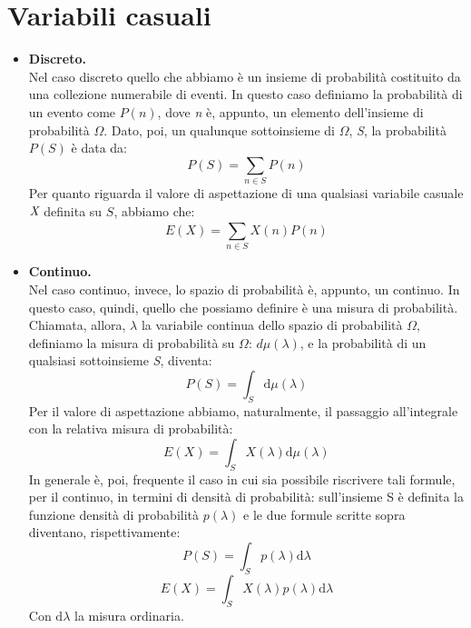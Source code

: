 \section{Variabili casuali} %
\begin{itemize}
\item \textbf{Discreto.}\\

Nel caso discreto quello che abbiamo è un insieme di probabilità costituito da una collezione numerabile di  eventi. In questo caso definiamo la probabilità di un evento come $P(n)$, dove \emph{n} è, appunto, un elemento dell'insieme di probabilità $\Omega$.
Dato, poi, un qualunque sottoinsieme di $\Omega$, \emph{S}, la probabilità $P(S)$ è data da:
\begin{equation}
P\left(S\right)=\sum_{n\in S}P(n)
\end{equation}
Per quanto riguarda il valore di aspettazione di una qualsiasi variabile casuale $\emph{X}$ definita su $S$, abbiamo che:
\begin{equation}
E\left(X\right)=\sum_{n\in S}^{}X(n)P(n)
\end{equation}
\item \textbf{Continuo.}\\

Nel caso continuo, invece, lo spazio di probabilità è, appunto, un continuo. In questo caso, quindi, quello che possiamo definire è una misura di probabilità. Chiamata, allora, $\lambda$ la variabile continua dello spazio di probabilità $\Omega$, definiamo la misura di probabilità su $\Omega$: $d\mu(\lambda)$, e la probabilità di un qualsiasi sottoinsieme \emph{S}, diventa:
\begin{equation}
P\left(S\right)=\int_{S}^{}{\textrm{d}\mu\left(\lambda\right)}
\end{equation}
Per il valore di aspettazione abbiamo, naturalmente, il passaggio all'integrale con la relativa misura di probabilità:
\begin{equation}
E\left(X\right)=\int_{S}^{}{X(\lambda) \textrm{d}\mu(\lambda)}
\end{equation}
In generale è, poi, frequente il caso in cui sia possibile riscrivere tali formule, per il continuo, in termini di densità di probabilità: sull'insieme S è definita la funzione densità di probabilità $p(\lambda)$ e le due formule scritte sopra diventano, rispettivamente:
\begin{equation}
P\left(S\right)=\int_{S}^{}{p(\lambda)\textrm{d}\lambda}
\end{equation}
\begin{equation}
E\left(X\right)=\int_{S}^{}{X(\lambda)p(\lambda) \textrm{d}\lambda}
\end{equation}
Con $\textrm{d}\lambda$ la misura ordinaria.
\end{itemize}

